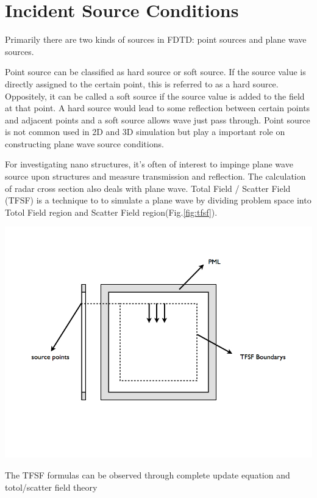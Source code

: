 \section{Incident Source Conditions}
Primarily there are two kinds of sources in FDTD: point sources and plane wave sources.

Point source can be classified as hard source or soft source. If the source value is directly assigned to the certain
point, this is referred to as a hard source. Oppositely, it can be called a soft source if the source value is added to
the field at that point. A hard source would lead to some reflection between certain points and adjacent points and a
soft source allows wave just pass through. Point source is not common used in 2D and 3D simulation but play a important
role on constructing plane wave source conditions.

For investigating nano structures, it's often of interest to impinge plane wave source upon structures and measure
transmission and reflection. The calculation of radar cross section also deals with plane wave. Total Field / Scatter
Field (TFSF) is a technique to to simulate a plane wave by dividing problem space into Totol Field region and Scatter
Field region(Fig.\ref{fig:tfsf}).

\begin{center}\label{fig:tfsf}
\includegraphics[scale=0.5]{images/tfsf.jpg}
\end{center}

The TFSF formulas can be observed through complete update equation and totol/scatter field theory

